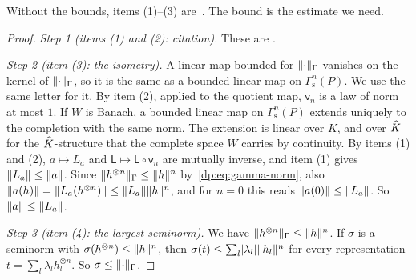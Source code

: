 Without the bounds, items (1)--(3) are~\cite[Th.~IV.1, Prop.~IV.5]{Ro}. The bound is the estimate we need.

\begin{proof}
\emph{Step 1 (items (1) and (2): citation).} These are \cite[Lemma~Q.1(1),(2)]{I}.

\emph{Step 2 (item (3): the isometry).} A linear map bounded for $\lVert \cdot\rVert_\Gamma$ vanishes on the kernel of $\lVert \cdot\rVert_\Gamma$, so it is the same as a bounded linear map on $\Gamma^n_{\mathrm s}(P)$. We use the same letter for it. By item (2), applied to the quotient map, $\mathsf v_n$ is a law of norm at most $1$. If $W$ is Banach, a bounded linear map on $\Gamma^n_{\mathrm s}(P)$ extends uniquely to the completion with the same norm. The extension is linear over $K$, and over $\widehat K$ for the $\widehat K$\nobreakdash-structure that the complete space $W$ carries by continuity. By items (1) and (2), $a\mapsto L_a$ and $\mathsf L\mapsto\mathsf L\circ\mathsf v_n$ are mutually inverse, and item (1) gives $\lVert L_a\rVert\le\lVert a\rVert$. Since $\lVert h^{\otimes n}\rVert_\Gamma\le\lVert h\rVert^n$ by~\eqref{dp:eq:gamma-norm}, also $\lVert a(h)\rVert=\lVert L_a(h^{\otimes n})\rVert\le\lVert L_a\rVert\lVert h\rVert^n$, and for $n=0$ this reads $\lVert a(0)\rVert\le\lVert L_a\rVert$. So $\lVert a\rVert\le\lVert L_a\rVert$.

\emph{Step 3 (item (4): the largest seminorm).} We have $\lVert h^{\otimes n}\rVert_\Gamma\le\lVert h\rVert^n$. If $\sigma$ is a seminorm with $\sigma(h^{\otimes n})\le\lVert h\rVert^n$, then $\sigma(t)\le\sum_l\lvert \lambda_l\rvert\lVert h_l\rVert^n$ for every representation $t=\sum_l\lambda_lh_l^{\otimes n}$. So $\sigma\le\lVert \cdot\rVert_\Gamma$.
\end{proof}

